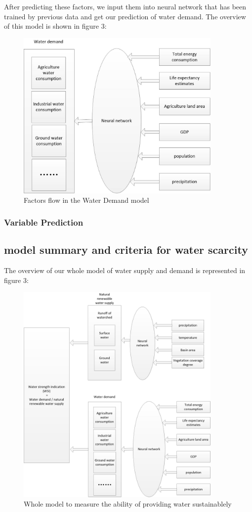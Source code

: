 \documentclass{mcmthesis}
\begin{document}
After predicting these factors, we input them into neural network that has been trained by previous data and get our prediction of water demand. The overview of this model is shown in figure 3:

\begin{figure}[h]
	\small
	\centering
	\includegraphics[width=10cm]{waterdemand.jpg}
	\caption{Factors flow in the Water Demand model} \label{fig:cc}
\end{figure}

\subsubsection{Variable Prediction}

\subsection{model summary and criteria for water scarcity}
The overview of our whole model of water supply and demand is represented in figure 3:
\begin{figure}[h]
	\small
	\centering
	\includegraphics[width=10cm]{model.jpg}
	\caption{Whole model to measure the ability of providing water sustainablely} \label{fig:dd}
\end{figure}
\end{document}
